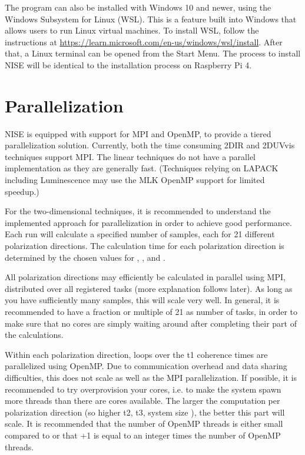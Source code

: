 The program can also be installed with Windows 10 and newer, using the Windows
Subsystem for Linux (WSL). This is a feature built into Windows that allows users to
run Linux virtual machines. To install WSL, follow the instructions at
\url{https://learn.microsoft.com/en-us/windows/wsl/install}. After that, a Linux
terminal can be opened from the Start Menu. The process to install NISE will be
identical to the installation process on Raspberry Pi 4.

\section{Parallelization}
NISE is equipped with support for MPI and OpenMP, to provide a tiered parallelization
solution. Currently, both the time consuming 2DIR and 2DUVvis techniques support MPI.
The linear techniques do not have a parallel implementation as they are generally fast.
(Techniques relying on LAPACK including Luminescence may use the MLK OpenMP support
for limited speedup.)

For the two-dimensional techniques, it is recommended to understand the implemented
approach for parallelization in order to achieve good performance. Each run will
calculate a specified number of samples, each for 21 different polarization directions.
The calculation time for each polarization direction is determined by the chosen values
for , , and .

All polarization directions may efficiently be calculated in parallel using MPI,
distributed over all registered tasks (more explanation follows later). As long as you
have sufficiently many samples, this will scale very well. In general, it is
recommended to have a fraction or multiple of 21 as number of tasks, in order to make
sure that no cores are simply waiting around after completing their part of the
calculations.

Within each polarization direction, loops over the t1 coherence times are parallelized
using OpenMP. Due to communication overhead and data sharing difficulties, this does
not scale as well as the MPI parallelization. If possible, it is recommended to try
overprovision your cores, i.e. to make the system spawn more threads than there are
cores available. The larger the computation per polarization direction (so higher t2,
t3, system size ), the better this part will scale. It is recommended
that the number of OpenMP threads is either small compared to  or that
+1 is equal to an integer times the number of OpenMP threads.

